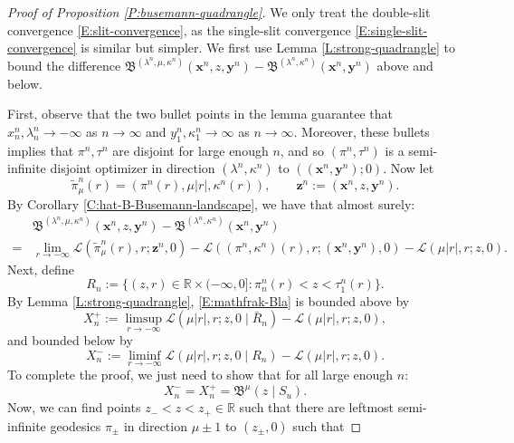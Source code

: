 \documentclass[11pt]{article}
\newcommand{\R}{\mathbb{R}}
\newcommand{\la}{\lambda}
\newcommand{\cL}{\mathcal{L}}
\newcommand{\X}{\times}
\newcommand{\bx}{\mathbf{x}}
\newcommand{\by}{\mathbf{y}}
\newcommand{\bz}{\mathbf{z}}
\theoremstyle{definition} %
\theoremstyle{remark} %
\begin{document}
\begin{proof}[Proof of Proposition \ref{P:busemann-quadrangle}]
	We only treat the double-slit convergence \eqref{E:slit-convergence}, as the single-slit convergence \eqref{E:single-slit-convergence} is similar but simpler.
	We first use Lemma \ref{L:strong-quadrangle} to bound the difference $\mathfrak B^{(\la^n, \mu, \kappa^n)}(\bx^n, z, \by^n) - \mathfrak B^{(\la^n, \kappa^n)}(\bx^n, \by^n)$ above and below. 
	
	First, observe that the two bullet points in the lemma guarantee that $x^n_n, \la^n_n \to -\infty$ as $n \to \infty$ and $y^n_1, \kappa^n_1 \to \infty$ as $n \to \infty$. Moreover, these bullets implies that $\pi^n, \tau^n$ are disjoint for large enough $n$, and so $(\pi^n, \tau^n)$ is a semi-infinite disjoint optimizer in direction $(\la^n, \kappa^n)$ to $((\bx^n, \by^n); 0)$. Now let
	$$
	\tilde \pi^n_\mu(r) = (\pi^n(r), \mu |r|, \kappa^n(r)), \qquad \bz^n := (\bx^n, z, \by^n).
	$$
	By Corollary \ref{C:hat-B-Busemann-landscape}, we have that almost surely:
	\begin{equation}
	\label{E:mathfrak-Bla}
	\begin{split}
&\mathfrak B^{(\la^n, \mu, \kappa^n)}(\bx^n, z, \by^n) - \mathfrak B^{(\la^n, \kappa^n)}(\bx^n, \by^n) \\
= &\lim_{r \to -\infty} \cL(\tilde \pi^n_\mu(r), r; \bz^n, 0) - \cL((\pi^n, \kappa^n)(r), r; (\bx^n, \by^n), 0) - \cL(\mu |r|, r; z, 0).
	\end{split}
	\end{equation}
	Next, define
	$$
	R_n := \{(z, r) \in \R \X (-\infty, 0] : \pi^n_n(r) < z < \tau^n_1(r)\}.
	$$
	By Lemma \ref{L:strong-quadrangle}, \eqref{E:mathfrak-Bla} is bounded above by
	\begin{equation}
	\label{E:limsup-above}
	X_n^+ := \limsup_{r \to -\infty} \cL(\mu |r|, r; z, 0 \mid \bar R_n) - \cL(\mu |r|, r; z, 0),
	\end{equation}
	and bounded below by
		\begin{equation}
	\label{E:liminf-below}
	X_n^- := \liminf_{r \to -\infty} \cL(\mu |r|, r; z, 0 \mid R_n) - \cL(\mu |r|, r; z, 0).
	\end{equation}
	To complete the proof, we just need to show that for all large enough $n$:
	\begin{equation}
	\label{E:X-limit}
X_n^- = X_n^+ = \mathfrak B^{\mu}(z \mid S_u).
	\end{equation}
	Now, we can find points $z_- < z < z_+ \in \R$ such that there are leftmost semi-infinite geodesics $\pi_\pm$ in direction $\mu \pm 1$ to $(z_\pm, 0)$ such that

\end{proof}
\end{document}
